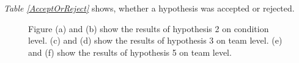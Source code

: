 \documentclass[sigchi]{acmart}
\begin{document}
\textit{Table \ref{AcceptOrReject}} shows, whether a hypothesis was accepted or rejected.


\begin{figure}[H]
  \centering
  \qquad
  \qquad
  \qquad
  \qquad
  \qquad
  \qquad
  \caption[Results of hypothesis 2, 3 and 5]{Figure (a) and (b) show the results of hypothesis 2 on condition level.  (c) and (d) show the results of hypothesis 3 on team level. (e) and (f) show the results of hypothesis 5 on team level.}
  \label{H2H3H5}
\end{figure}
\end{document}
